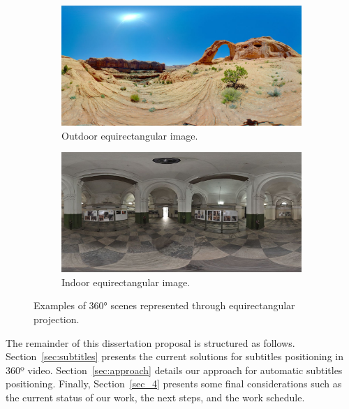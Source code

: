 \begin{figure}[!ht]
\centering
    \begin{subfigure}{0.47\linewidth}
        \centering
        \includegraphics[width=1\textwidth]{img/image (9).jpg}
        \caption{Outdoor equirectangular image.}
        \label{subfig:out_equi}
    \end{subfigure}\hfill
    \begin{subfigure}{0.47\linewidth}
        \centering
        \includegraphics[width=1\textwidth]{img/image (10).JPG}
        \caption{Indoor equirectangular image.}
        \label{subfig:in_equi}
    \end{subfigure}

\caption{Examples of 360° scenes represented through equirectangular projection.}
\label{fig:equirectangular_proj}
\end{figure}

The remainder of this dissertation proposal is structured as follows. Section~\ref{sec:subtitles} presents the current solutions for subtitles positioning in 360º video. Section~\ref{sec:approach} details our approach for automatic subtitles positioning. Finally, Section~\ref{sec_4} presents some final considerations such as the current status of our work, the next steps, and the work schedule.